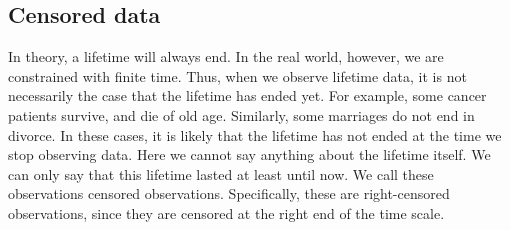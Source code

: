 \subsection{Censored data}
In theory, a lifetime will always end. In the real world, however, we are constrained with finite time. Thus, when we observe lifetime data, it is not necessarily the case that the lifetime has ended yet. For example, some cancer patients survive, and die of old age. Similarly, some marriages do not end in divorce. In these cases, it is likely that the lifetime has not ended at the time we stop observing data. Here we cannot say anything about the lifetime itself. We can only say that this lifetime lasted at least until now. We call these observations censored observations. Specifically, these are right-censored observations, since they are censored at the right end of the time scale.
